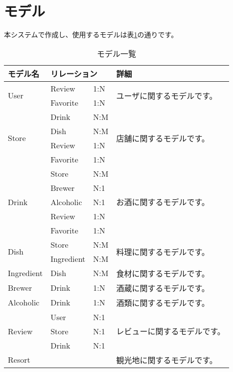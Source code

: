 \documentclass[a4j,titlepage]{jarticle}
\begin{document}
\section{モデル}

本システムで作成し、使用するモデルは表\ref{model}の通りです。

\begin{table}[!htbp]
\caption{モデル一覧}
\label{model}
\small
\begin{center}
\begin{tabular}{|l|l|l|p{5cm}|}\hline
モデル名 & \multicolumn{2}{|l|}{リレーション} & 詳細 \\\hline\hline
\multirow{2}{*}{User} & Review & 1:N & \multirow{2}{*}{ユーザに関するモデルです。}\\\cline{2-3}
 & Favorite & 1:N & \\\hline
\multirow{4}{*}{Store} & Drink & N:M & \multirow{4}{*}{店舗に関するモデルです。} \\\cline{2-3}
 & Dish & N:M & \\\cline{2-3}
 & Review & 1:N & \\\cline{2-3}
 & Favorite & 1:N & \\\hline
\multirow{5}{*}{Drink} & Store & N:M & \multirow{5}{*}{お酒に関するモデルです。} \\\cline{2-3}
 & Brewer & N:1 & \\\cline{2-3}
 & Alcoholic & N:1 & \\\cline{2-3}
 & Review & 1:N & \\\cline{2-3}
 & Favorite & 1:N & \\\hline
\multirow{2}{*}{Dish} & Store & N:M & \multirow{2}{*}{料理に関するモデルです。} \\\cline{2-3}
 & Ingredient & N:M & \\\hline
Ingredient & Dish & N:M & 食材に関するモデルです。 \\\hline
Brewer & Drink & 1:N & 酒蔵に関するモデルです。 \\\hline
Alcoholic & Drink & 1:N & 酒類に関するモデルです。 \\\hline
\multirow{3}{*}{Review} & User & N:1 & \multirow{3}{*}{レビューに関するモデルです。} \\\cline{2-3}
 & Store & N:1 & \\\cline{2-3}
 & Drink & N:1 & \\\hline
Resort & & & 観光地に関するモデルです。 \\\hline
\end{tabular}
\end{center}
\end{table}
\end{document}

